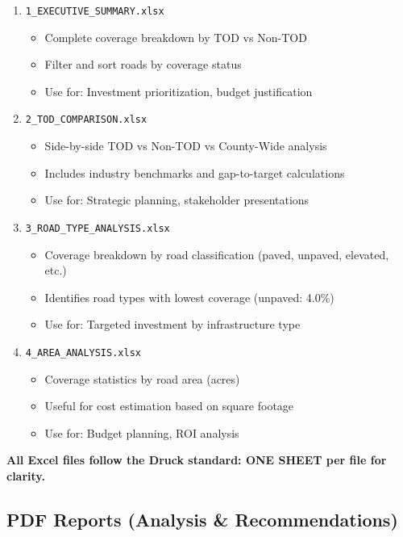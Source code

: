 \documentclass[11pt,letterpaper]{article}
\begin{document}
\begin{enumerate}[leftmargin=*]
    \item \texttt{1\_{EXECUTIVE}\_SUMMARY.xlsx}
    \begin{itemize}
        \item Complete coverage breakdown by TOD vs Non-TOD
        \item Filter and sort roads by coverage status
        \item Use for: Investment prioritization, budget justification
    \end{itemize}

    \item \texttt{2\_TOD\_COMPARISON.xlsx}
    \begin{itemize}
        \item Side-by-side TOD vs Non-TOD vs County-Wide analysis
        \item Includes industry benchmarks and gap-to-target calculations
        \item Use for: Strategic planning, stakeholder presentations
    \end{itemize}

    \item \texttt{3\_ROAD\_TYPE\_ANALYSIS.xlsx}
    \begin{itemize}
        \item Coverage breakdown by road classification (paved, unpaved, elevated, etc.)
        \item Identifies road types with lowest coverage (unpaved: 4.0\%)
        \item Use for: Targeted investment by infrastructure type
    \end{itemize}

    \item \texttt{4\_AREA\_ANALYSIS.xlsx}
    \begin{itemize}
        \item Coverage statistics by road area (acres)
        \item Useful for cost estimation based on square footage
        \item Use for: Budget planning, ROI analysis
    \end{itemize}
\end{enumerate}

\textbf{All Excel files follow the Druck standard: ONE SHEET per file for clarity.}

\subsection{PDF Reports (Analysis \& Recommendations)}
\end{document}
